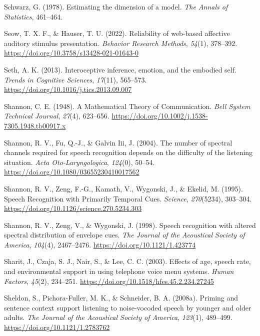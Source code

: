 \documentclass[a4paper, nobind]{templates/ociamthesis}
\newlength{\cslhangindent}
\newenvironment{CSLReferences}[2] %
 {%
  \setlength{\parindent}{0pt}
  \ifodd #1
  \let\oldpar\par
  \def\par{\hangindent=\cslhangindent\oldpar}
  \fi
  \setlength{\parskip}{1mm}
  \setlength{\baselineskip}{6mm}
 }%
 {}
\begin{document}
\begin{CSLReferences}{1}{0}
\leavevmode{}%
Schwarz, G. (1978). Estimating the dimension of a model. \emph{The Annals of Statistics}, 461--464.

\leavevmode{}%
Seow, T. X. F., \& Hauser, T. U. (2022). {Reliability of web-based affective auditory stimulus presentation}. \emph{Behavior Research Methods}, \emph{54}(1), 378--392. \url{https://doi.org/10.3758/s13428-021-01643-0}

\leavevmode{}%
Seth, A. K. (2013). Interoceptive inference, emotion, and the embodied self. \emph{Trends in Cognitive Sciences}, \emph{17}(11), 565--573. \url{https://doi.org/10.1016/j.tics.2013.09.007}

\leavevmode{}%
Shannon, C. E. (1948). A Mathematical Theory of Communication. \emph{Bell System Technical Journal}, \emph{27}(4), 623--656. \url{https://doi.org/10.1002/j.1538-7305.1948.tb00917.x}

\leavevmode{}%
Shannon, R. V., Fu, Q.-J., \& Galvin Iii, J. (2004). {The number of spectral channels required for speech recognition depends on the difficulty of the listening situation}. \emph{Acta Oto-Laryngologica}, \emph{124}(0), 50--54. \url{https://doi.org/10.1080/03655230410017562}

\leavevmode{}%
Shannon, R. V., Zeng, F.-G., Kamath, V., Wygonski, J., \& Ekelid, M. (1995). Speech Recognition with Primarily Temporal Cues. \emph{Science}, \emph{270}(5234), 303--304. \url{https://doi.org/10.1126/science.270.5234.303}

\leavevmode{}%
Shannon, R. V., Zeng, V., \& Wygonski, J. (1998). Speech recognition with altered spectral distribution of envelope cues. \emph{The Journal of the Acoustical Society of America}, \emph{104}(4), 2467--2476. \url{https://doi.org/10.1121/1.423774}

\leavevmode{}%
Sharit, J., Czaja, S. J., Nair, S., \& Lee, C. C. (2003). {Effects of age, speech rate, and environmental support in using telephone voice menu systems}. \emph{Human Factors}, \emph{45}(2), 234--251. \url{https://doi.org/10.1518/hfes.45.2.234.27245}

\leavevmode{}%
Sheldon, S., Pichora-Fuller, M. K., \& Schneider, B. A. (2008a). Priming and sentence context support listening to noise-vocoded speech by younger and older adults. \emph{The Journal of the Acoustical Society of America}, \emph{123}(1), 489--499. \url{https://doi.org/10.1121/1.2783762}


\end{CSLReferences}
\end{document}
